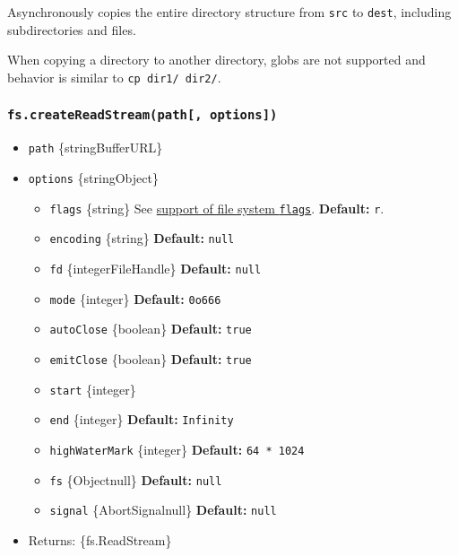 Asynchronously copies the entire directory structure from \texttt{src}
to \texttt{dest}, including subdirectories and files.

When copying a directory to another directory, globs are not supported
and behavior is similar to \texttt{cp\ dir1/\ dir2/}.

\subsubsection{\texorpdfstring{\texttt{fs.createReadStream(path{[},\ options{]})}}{fs.createReadStream(path{[}, options{]})}}\label{fs.createreadstreampath-options}

\begin{itemize}
\tightlist
\item
  \texttt{path} \{string\textbar Buffer\textbar URL\}
\item
  \texttt{options} \{string\textbar Object\}

  \begin{itemize}
  \tightlist
  \item
    \texttt{flags} \{string\} See \hyperref[file-system-flags]{support
    of file system \texttt{flags}}. \textbf{Default:}
    \texttt{\textquotesingle{}r\textquotesingle{}}.
  \item
    \texttt{encoding} \{string\} \textbf{Default:} \texttt{null}
  \item
    \texttt{fd} \{integer\textbar FileHandle\} \textbf{Default:}
    \texttt{null}
  \item
    \texttt{mode} \{integer\} \textbf{Default:} \texttt{0o666}
  \item
    \texttt{autoClose} \{boolean\} \textbf{Default:} \texttt{true}
  \item
    \texttt{emitClose} \{boolean\} \textbf{Default:} \texttt{true}
  \item
    \texttt{start} \{integer\}
  \item
    \texttt{end} \{integer\} \textbf{Default:} \texttt{Infinity}
  \item
    \texttt{highWaterMark} \{integer\} \textbf{Default:}
    \texttt{64\ *\ 1024}
  \item
    \texttt{fs} \{Object\textbar null\} \textbf{Default:} \texttt{null}
  \item
    \texttt{signal} \{AbortSignal\textbar null\} \textbf{Default:}
    \texttt{null}
  \end{itemize}
\item
  Returns: \{fs.ReadStream\}
\end{itemize}

